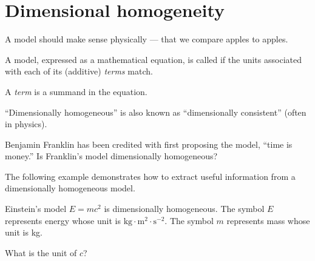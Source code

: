 \documentclass[../main.tex]{subfiles}
\begin{document}
 \section{Dimensional homogeneity}

A model should make sense physically --- that we compare apples to apples.

\begin{definition} \label{def:dimensional-homogeneity}
  A model, expressed as a mathematical equation, is called  if the units associated with each of its (additive) \emph{terms} match.
\end{definition}

A \emph{term} is a summand in the equation.

\faPencil*{} ``Dimensionally homogeneous'' is also known as ``dimensionally consistent'' (often in physics).


\begin{example}
  Benjamin Franklin has been credited with first proposing the model, ``time is money.'' Is Franklin's model dimensionally homogeneous?

\end{example}

The following example demonstrates how to extract useful information from a dimensionally homogeneous model.
\begin{example}
  Einstein's model \(E = mc^{2}\) is dimensionally homogeneous. The symbol \(E\) represents energy whose unit is \(\text{kg} \cdot \text{m}^{2} \cdot \text{s}^{-2}\). The symbol \(m\) represents mass whose unit is kg. 

  What is the unit of \(c\)?
\end{example}
\end{document}
